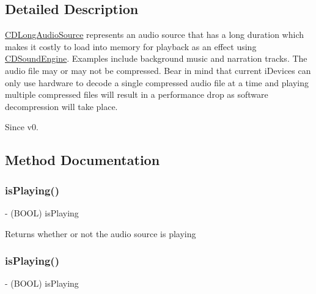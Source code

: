 \subsection{Detailed Description}
\hyperlink{interfaceCDLongAudioSource}{C\+D\+Long\+Audio\+Source} represents an audio source that has a long duration which makes it costly to load into memory for playback as an effect using \hyperlink{interfaceCDSoundEngine}{C\+D\+Sound\+Engine}. Examples include background music and narration tracks. The audio file may or may not be compressed. Bear in mind that current i\+Devices can only use hardware to decode a single compressed audio file at a time and playing multiple compressed files will result in a performance drop as software decompression will take place. \begin{DoxySince}{Since}
v0. 
\end{DoxySince}


\subsection{Method Documentation}
\mbox{\label{interfaceCDLongAudioSource_a555f3c24d76f6e4d23bd809c2d064994}} 
\subsubsection{\texorpdfstring{is\+Playing()}{isPlaying()}\hspace{0.1cm}{\footnotesize\ttfamily [1/4]}}
{\footnotesize\ttfamily -\/ (B\+O\+OL) is\+Playing \begin{DoxyParamCaption}{ }\end{DoxyParamCaption}}

Returns whether or not the audio source is playing \mbox{\label{interfaceCDLongAudioSource_a555f3c24d76f6e4d23bd809c2d064994}} 
\subsubsection{\texorpdfstring{is\+Playing()}{isPlaying()}\hspace{0.1cm}{\footnotesize\ttfamily [2/4]}}
{\footnotesize\ttfamily -\/ (B\+O\+OL) is\+Playing \begin{DoxyParamCaption}{ }\end{DoxyParamCaption}}

